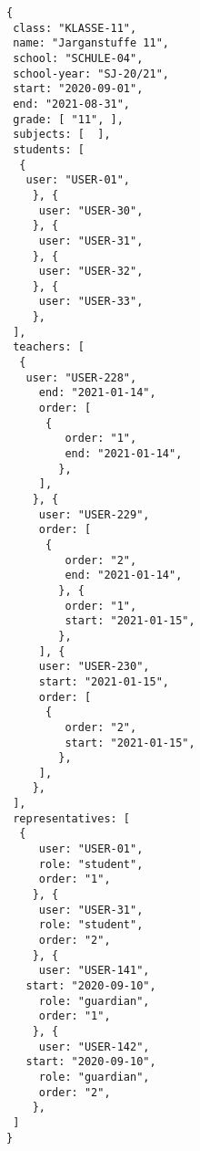 
\begin{lstlisting}[caption={Klassen-Datenmodell Beispiel 2: Jahrgangstufe 11, Sekundarstufe 2},frame=tlrb]
{
 class: "KLASSE-11",
 name: "Jarganstuffe 11",
 school: "SCHULE-04",
 school-year: "SJ-20/21",
 start: "2020-09-01",
 end: "2021-08-31",
 grade: [ "11", ],
 subjects: [  ],
 students: [
  { 
   user: "USER-01",
	}, { 
	 user: "USER-30",
	}, { 
	 user: "USER-31",
	}, { 
	 user: "USER-32",
	}, { 
	 user: "USER-33",
	},
 ],
 teachers: [
  { 
   user: "USER-228",
	 end: "2021-01-14",
	 order: [
	  {
		 order: "1",
		 end: "2021-01-14",
		},
	 ],
	}, { 
	 user: "USER-229",
	 order: [
	  {
		 order: "2",
		 end: "2021-01-14",
		}, {
		 order: "1",
		 start: "2021-01-15",
		},
	 ], { 
	 user: "USER-230",
	 start: "2021-01-15",
	 order: [
	  {
		 order: "2",
		 start: "2021-01-15",
		},
	 ],
	},
 ],
 representatives: [
  {
	 user: "USER-01",
	 role: "student",
	 order: "1",	 
	}, {
	 user: "USER-31",
	 role: "student",
	 order: "2",	 
	}, {
	 user: "USER-141",
   start: "2020-09-10",
	 role: "guardian",
	 order: "1",	 
	}, {
	 user: "USER-142",
   start: "2020-09-10",
	 role: "guardian",
	 order: "2",	 
	},  
 ]
}
\end{lstlisting}
